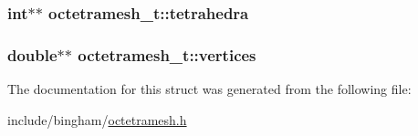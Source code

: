 \label{structoctetramesh__t_a91308dcaf1e928418dbf84ae3b673044}
\hypertarget{structoctetramesh__t_a86a9824e26a23c4503f00f613a41668f}{
\subsubsection[{tetrahedra}]{\setlength{\rightskip}{0pt plus 5cm}int$\ast$$\ast$ {\bf octetramesh\_\-t::tetrahedra}}}
\label{structoctetramesh__t_a86a9824e26a23c4503f00f613a41668f}
\hypertarget{structoctetramesh__t_a35375ef64e394e82df7e3ae1a29c357d}{
\subsubsection[{vertices}]{\setlength{\rightskip}{0pt plus 5cm}double$\ast$$\ast$ {\bf octetramesh\_\-t::vertices}}}
\label{structoctetramesh__t_a35375ef64e394e82df7e3ae1a29c357d}


The documentation for this struct was generated from the following file:\begin{DoxyCompactItemize}
\item 
include/bingham/\hyperlink{octetramesh_8h}{octetramesh.h}\end{DoxyCompactItemize}
